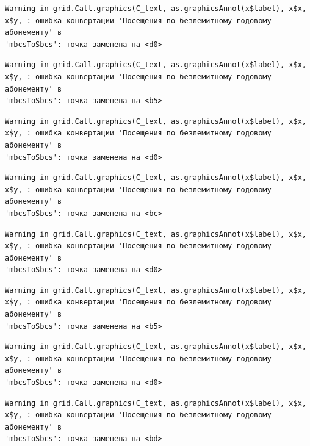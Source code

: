 \documentclass[
  letterpaper,
  DIV=11,
  numbers=noendperiod]{scrreprt}
\begin{document}
\begin{verbatim}
Warning in grid.Call.graphics(C_text, as.graphicsAnnot(x$label), x$x,
x$y, : ошибка конвертации 'Посещения по безлемитному годовому абонементу' в
'mbcsToSbcs': точка заменена на <d0>
\end{verbatim}

\begin{verbatim}
Warning in grid.Call.graphics(C_text, as.graphicsAnnot(x$label), x$x,
x$y, : ошибка конвертации 'Посещения по безлемитному годовому абонементу' в
'mbcsToSbcs': точка заменена на <b5>
\end{verbatim}

\begin{verbatim}
Warning in grid.Call.graphics(C_text, as.graphicsAnnot(x$label), x$x,
x$y, : ошибка конвертации 'Посещения по безлемитному годовому абонементу' в
'mbcsToSbcs': точка заменена на <d0>
\end{verbatim}

\begin{verbatim}
Warning in grid.Call.graphics(C_text, as.graphicsAnnot(x$label), x$x,
x$y, : ошибка конвертации 'Посещения по безлемитному годовому абонементу' в
'mbcsToSbcs': точка заменена на <bc>
\end{verbatim}

\begin{verbatim}
Warning in grid.Call.graphics(C_text, as.graphicsAnnot(x$label), x$x,
x$y, : ошибка конвертации 'Посещения по безлемитному годовому абонементу' в
'mbcsToSbcs': точка заменена на <d0>
\end{verbatim}

\begin{verbatim}
Warning in grid.Call.graphics(C_text, as.graphicsAnnot(x$label), x$x,
x$y, : ошибка конвертации 'Посещения по безлемитному годовому абонементу' в
'mbcsToSbcs': точка заменена на <b5>
\end{verbatim}

\begin{verbatim}
Warning in grid.Call.graphics(C_text, as.graphicsAnnot(x$label), x$x,
x$y, : ошибка конвертации 'Посещения по безлемитному годовому абонементу' в
'mbcsToSbcs': точка заменена на <d0>
\end{verbatim}

\begin{verbatim}
Warning in grid.Call.graphics(C_text, as.graphicsAnnot(x$label), x$x,
x$y, : ошибка конвертации 'Посещения по безлемитному годовому абонементу' в
'mbcsToSbcs': точка заменена на <bd>
\end{verbatim}
\end{document}
